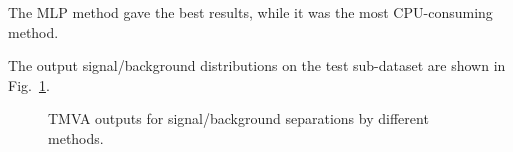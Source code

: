 The MLP method gave the best results, while it was the most CPU-consuming method.

The output signal/background distributions on the test sub-dataset are shown in Fig.~\ref{output_separation_allE}.
\begin{figure}[htbp]
	\centering
	\caption{TMVA outputs for signal/background separations by different methods.\label{output_separation_allE}}
\end{figure}

